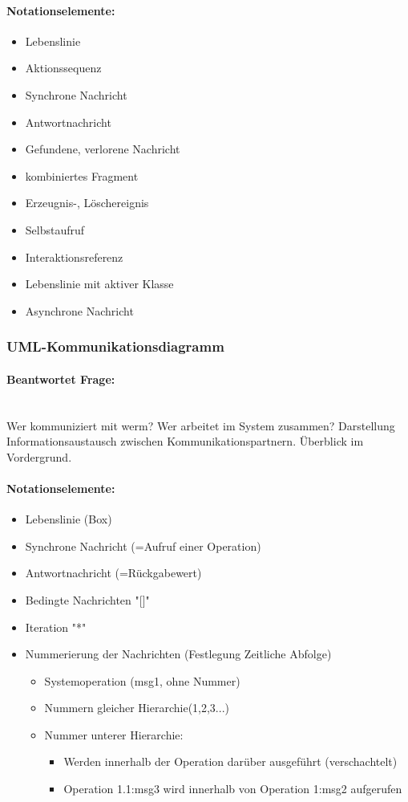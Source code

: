 \documentclass[../ZF_SWEN1.tex]{subfiles}
\begin{document}
\paragraph{Notationselemente:}
\begin{itemize}
	\item Lebenslinie
	\item Aktionssequenz
	\item Synchrone Nachricht
	\item Antwortnachricht
	\item Gefundene, verlorene Nachricht
	\item kombiniertes Fragment
	\item Erzeugnis-, Löschereignis
	\item Selbstaufruf
	\item Interaktionsreferenz
	\item Lebenslinie mit aktiver Klasse
	\item Asynchrone Nachricht
\end{itemize}




	



\subsubsection{UML-Kommunikationsdiagramm}
\paragraph{Beantwortet Frage:}\\
Wer kommuniziert mit werm? Wer arbeitet im System zusammen? Darstellung Informationsaustausch zwischen Kommunikationspartnern. Überblick im Vordergrund.
\paragraph{Notationselemente:}
\begin{itemize}
	\item Lebenslinie (Box)
	\item Synchrone Nachricht (=Aufruf einer Operation)
	\item Antwortnachricht (=Rückgabewert)
	\item Bedingte Nachrichten "[]"
	\item Iteration "*"
	\item Nummerierung der Nachrichten (Festlegung Zeitliche Abfolge)
	\begin{itemize}
		\item Systemoperation (msg1, ohne Nummer)
		\item Nummern gleicher Hierarchie(1,2,3...)
		\item Nummer unterer Hierarchie:
		\begin{itemize}
			\item Werden innerhalb der Operation darüber ausgeführt (verschachtelt)
			\item Operation 1.1:msg3 wird innerhalb von Operation 1:msg2 aufgerufen
		\end{itemize}
	\end{itemize}

\end{itemize}
\end{document}
